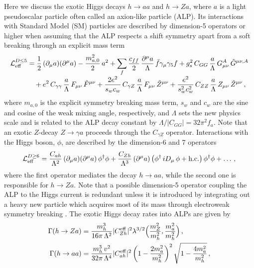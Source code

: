 Here we discuss the exotic Higgs decays $h\to aa$ and $h\to Za$, where $a$ is a light pseudoscalar particle often called an axion-like particle (ALP). Its interactions with Standard Model (SM) particles are described by dimension-5 operators or higher when assuming that the ALP respects a shift symmetry apart from a soft breaking through an explicit mass term \cite{Georgi:1986df} 
%
\begin{equation}\label{Leff}
\begin{aligned}
   {\cal L}_{\rm eff}^{D\le 5}
   &= \frac12 \left( \partial_\mu a\right)\!\left( \partial^\mu a\right)
    - \frac{m_{a,0}^2}{2}\,a^2 
    + \sum_f \frac{c_{ff}}{2}\,\frac{\partial^\mu a}{\Lambda}\,\bar f\gamma_\mu\gamma_5 f  + g_s^2\,C_{GG}\,\frac{a}{\Lambda}\,G_{\mu\nu}^A\,\tilde G^{\mu\nu,A} \\[-1mm]
   &\quad\mbox{}+ e^2\,C_{\gamma\gamma}\,\frac{a}{\Lambda}\,F_{\mu\nu}\,\tilde F^{\mu\nu}
    + \frac{2e^2}{s_w c_w}\,C_{\gamma Z}\,\frac{a}{\Lambda}\,F_{\mu\nu}\,\tilde Z^{\mu\nu}
    + \frac{e^2}{s_w^2 c_w^2}\,C_{ZZ}\,\frac{a}{\Lambda}\,Z_{\mu\nu}\,\tilde Z^{\mu\nu} \,,
\end{aligned}
\end{equation}
%
where $m_{a,0}$ is the explicit symmetry breaking mass term, $s_w$ and $c_w$ are the sine and cosine of the weak mixing angle, respectively, and $\Lambda$ sets the new physics scale and is related to the ALP decay constant by $\Lambda/|C_{GG}| = 32 \pi^2 f_a$. Note that an exotic $Z$-decay $Z\to\gamma a$ proceeds through the $C_{\gamma Z}$ operator.  Interactions with the Higgs boson, $\phi$, are described by the dimension-6 and 7 operators
%
\begin{equation}\label{LeffD>5}
   {\cal L}_{\rm eff}^{D\ge 6}
   = \frac{C_{ah}}{\Lambda^2} \left( \partial_\mu a\right)\!\left( \partial^\mu a\right) \phi^\dagger\phi
    + \frac{C_{Zh}}{\Lambda^3} \left( \partial^\mu a\right) 
    \left( \phi^\dagger\,iD_\mu\,\phi + \mbox{h.c.} \right) \phi^\dagger\phi + \dots  \,,
\end{equation}
%
where the first operator mediates the decay $h\to aa$, while the second one is responsible for $h\to Za$. Note that a possible dimension-5 operator coupling the ALP to the Higgs current is redundant unless it is introduced by integrating out a heavy new particle which acquires most of its mass through electroweak symmetry breaking \cite{Bauer:2016ydr,Bauer:2016zfj,Bauer:2017nlg,Bauer:2017ris}. The exotic Higgs decay rates into ALPs are given by  
\begin{align}
\Gamma(h \to Za)&=\frac{m_h^3}{16\pi\,\Lambda^2}|C_{Zh}^\text{eff}|^2\lambda^{3/2}\Big(\frac{m_Z^2}{m_h^2},\frac{m_a^2}{m_h^2}\Big)\,,\\
\Gamma(h \to aa)&=\frac{m_h^3\,v^2}{32\pi\,\Lambda^4}|C_{ah}^{\rm eff}|^2\left(1-\frac{2m_a^2}{m_h^2}\right)^2\sqrt{1-\frac{4m_a^2}{m_h^2}}\,,
\end{align}
